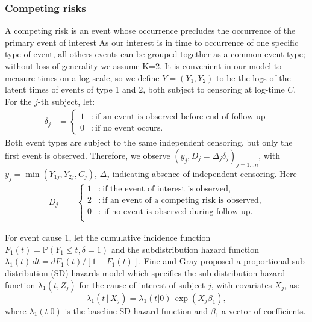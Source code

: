 \documentclass[twoside,a4paper,12pt]{article}
\newcommand{\PP}{\mathbb{P}}
\theoremstyle{plain}
\theoremstyle{definition}
\begin{document}
\subsubsection{Competing risks}


A competing risk is an event whose occurrence precludes the occurrence of the primary event of interest
As our interest is in time to occurrence of one specific type of event, %
all others events can be grouped together as a common event type; without loss of generality we assume K=2.
It is convenient in our model to measure times on a log-scale,
so we define $Y=(Y_1, Y_2)$ to be the logs of the latent times of events of type 1 and 2, 
both subject to censoring at log-time $C$. 
For the $j$-th subject, let:
\begin{align*} %
\delta_j&=
\left\{
\begin{aligned}
1&:~\text{if an event is observed before end of follow-up} \\ %
0&:~\text{if no event occurs.}
\end{aligned}
\right.
\end{align*}
{Both} {event types} are subject to the same {independent} censoring,
{but only the first event is observed}. 
Therefore, we observe $(y_j,D_j=\Delta_j\delta_j)_{j=1\ldots n}$, with 
{$y_j=\min(Y_{1j},Y_{2j},C_j)$,}
$\Delta_j$ indicating absence of {independent} censoring. Here
\begin{align*}
D_j&=
\left\{
\begin{aligned}
1&:~\text{if the event of interest is observed,} \\
2&:~\text{if an event of a competing risk is observed,} \\
0&:~\text{if no event is observed during follow-up}.\\
\end{aligned}
\right.
\end{align*}

For event cause 1, let the cumulative incidence function $F_1(t)=\PP(Y_1\leq t,\delta=1)$
and the subdistribution hazard function 
$\lambda_1(t)\,dt=dF_1(t)/[1-F_1(t)]$. 
Fine and Gray proposed a proportional sub-distribution (SD) hazards model 
\citep{FineGray1999} which specifies the sub-distribution hazard function {$\lambda_1(t,Z_j)$}  
for the cause of interest %
of subject $j$, with covariates $X_j$, as:
$$
{\lambda}_1(t \, | \, X_j)=\lambda_{1}(t|0) \, \exp(X_j \beta_1),
$$
where $\lambda_{1}(t|0)$ is the baseline SD-hazard function and $\beta_1$ a vector of coefficients.
\end{document}
